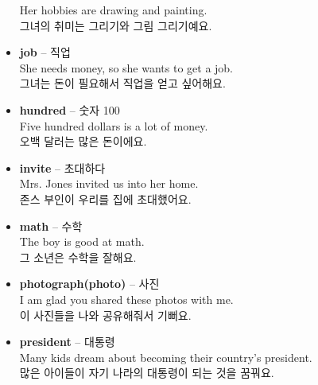 \documentclass[12pt]{article}
\begin{document}
\begin{itemize}
    Her hobbies are drawing and painting. \\
    그녀의 취미는 그리기와 그림 그리기예요.
    \item \textbf{job} -- 직업 \\
    She needs money, so she wants to get a job. \\
    그녀는 돈이 필요해서 직업을 얻고 싶어해요.
    \item \textbf{hundred} -- 숫자 100 \\
    Five hundred dollars is a lot of money. \\
    오백 달러는 많은 돈이에요.
    \item \textbf{invite} -- 초대하다 \\
    Mrs. Jones invited us into her home. \\
    존스 부인이 우리를 집에 초대했어요.
    \item \textbf{math} -- 수학 \\
    The boy is good at math. \\
    그 소년은 수학을 잘해요.
    \item \textbf{photograph(photo)} -- 사진 \\
    I am glad you shared these photos with me. \\
    이 사진들을 나와 공유해줘서 기뻐요.
    \item \textbf{president} -- 대통령 \\
    Many kids dream about becoming their country's president. \\
    많은 아이들이 자기 나라의 대통령이 되는 것을 꿈꿔요.
\end{itemize}

\newpage
\end{document}
